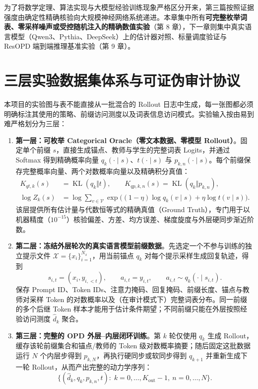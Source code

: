 \documentclass[lang=cn,scheme=chinese,openany]{elegantbook}
\begin{document}
为了将数学定理、算法实现与大模型经验训练现象严格区分开来，第三篇按照证据强度由确定性精确核验向大规模神经网络系统递进。本章集中所有\textbf{可完整枚举词表、零采样噪声或受控随机注入的精确数值实验}（第 8 章），下一章则集中真实语言模型（Qwen3、Pythia、DeepSeek）上的估计器对照、标量调度验证与 ResOPD 端到端推理基准实验（第 9 章）。

\section{三层实验数据集体系与可证伪审计协议}
\label{evidence:toy}

本项目的实验图与表不能直接从一批混合的 Rollout 日志中生成，每一张图都必须明确标注其使用的策略、前缀访问测度以及词表信息访问模式。实验输入按由易到难严格划分为三层：
\begin{enumerate}
\item \textbf{第一层：可枚举 Categorical Oracle（零文本数据、零模型 Rollout）}。固定单个前缀 $s$，直接生成锚点、教师与学生的完整词表 Logits，并通过 Softmax 得到精确概率向量 $q_k(\cdot\mid s)$、$t(\cdot\mid s)$ 与 $p_{k,n}(\cdot\mid s)$。每个前缀保存完整概率向量、两个对数概率向量以及精确积分真值：
\begin{align}
K_{qt,k}(s)&=\operatorname{KL}(q_k\Vert t),\qquad K_{qp,k,n}(s)=\operatorname{KL}(q_k\Vert p_{k,n}),\\
\log Z_k(s)&=\log\sum_{v\in\mathcal V}\exp\bigl((1-\eta)\log q_k(v\mid s)+\eta\log t(v\mid s)\bigr).
\end{align}
该层提供所有估计量与代数恒等式的精确真值（Ground Truth），专门用于以机器精度（$10^{-15}$）核验偏差、方差、均方误差、梯度旋度与外层硬同步渐近阶数。
\item \textbf{第二层：冻结外层轮次的真实语言模型前缀数据}。先选定一个不参与训练的独立提示文件 $\mathcal X=\{x_i\}_{i=1}^{N_x}$，用当前锚点 $q_k$ 对每个提示采样生成回复轨迹，得到
\begin{equation}
s_{i,t}=(x_i,y_{i,<t}),\qquad a_{i,t}=y_{i,t},\qquad a_{i,t}\sim q_k(\cdot\mid s_{i,t}).
\end{equation}
保存 Prompt ID、Token IDs、注意力掩码、回复掩码、前缀长度、锚点与教师对采样 Token 的对数概率以及（在审计模式下）完整词表分布。同一前缀的多个后继 Token 样本才能用于估计条件期望；不同前缀只能在外层按照经验访问测度 $\widehat d_k$ 聚合。
\item \textbf{第三层：完整的 OPD 外层--内层闭环训练}。第 $k$ 轮仅使用 $q_k$ 生成 Rollout，缓存该轮前缀集合和锚点/教师的 Token 级对数概率摘要；随后固定这批数据运行 $N$ 个内层步得到 $p_{k,N}$，再执行硬同步或软同步得到 $q_{k+1}$ 并重新生成下一轮 Rollout，从而产出完整的动力学序列：
\begin{equation}
\bigl\{(\widehat d_k,q_k,p_{k,n},t):\; k=0,\ldots,K_{\mathrm{out}}-1,\ n=0,\ldots,N\bigr\}.
\end{equation}
\end{enumerate}
\end{document}
